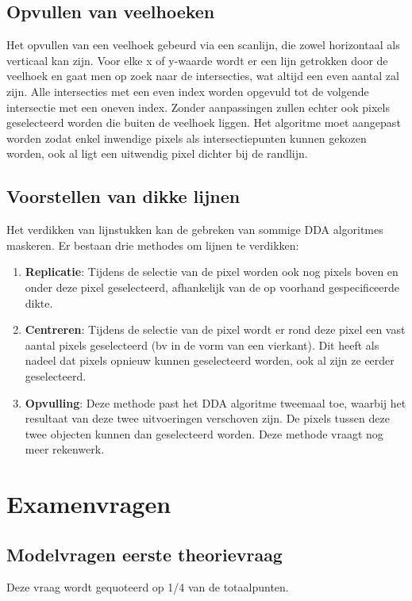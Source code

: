 \documentclass{report}
\begin{document}
	
	\chapter{Opvullen van veelhoeken}
	Het opvullen van een veelhoek gebeurd via een scanlijn, die zowel horizontaal als verticaal kan zijn. Voor elke x of y-waarde wordt er een lijn getrokken door de veelhoek en gaat men op zoek naar de intersecties, wat altijd een even aantal zal zijn. Alle intersecties met een even index worden opgevuld tot de volgende intersectie met een oneven index. Zonder aanpassingen zullen echter ook pixels geselecteerd worden die buiten de veelhoek liggen. Het algoritme moet aangepast worden zodat enkel inwendige pixels als intersectiepunten kunnen gekozen worden, ook al ligt een uitwendig pixel dichter bij de randlijn.
	
	\chapter{Voorstellen van dikke lijnen}
	Het verdikken van lijnstukken kan de gebreken van sommige DDA algoritmes maskeren. Er bestaan drie methodes om lijnen te verdikken:
	\begin{enumerate}
		\item \textbf{Replicatie}: Tijdens de selectie van de pixel worden ook nog pixels boven en onder deze pixel geselecteerd, afhankelijk van de op voorhand gespecificeerde dikte.
		\item \textbf{Centreren}: Tijdens de selectie van de pixel wordt er rond deze pixel een vast aantal pixels geselecteerd (bv in de vorm van een vierkant). Dit heeft als nadeel dat pixels opnieuw kunnen geselecteerd worden, ook al zijn ze eerder geselecteerd.
		\item \textbf{Opvulling}: Deze methode past het DDA algoritme tweemaal toe, waarbij het resultaat van deze twee uitvoeringen verschoven zijn. De pixels tussen deze twee objecten kunnen dan geselecteerd worden. Deze methode vraagt nog meer rekenwerk.
	\end{enumerate}
	
	\part{Examenvragen}
	\chapter{Modelvragen eerste theorievraag}
	Deze vraag wordt gequoteerd op 1/4 van de totaalpunten.
	
\end{document}
